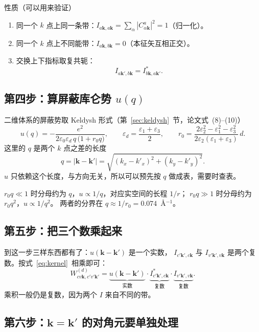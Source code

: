 \documentclass[11pt,a4paper]{ctexart}
\newcommand{\kk}{\mathbf{k}}
\newcommand{\kq}{\mathbf{k}'}
\newcommand{\eps}{\varepsilon}
\begin{document}
性质（可以用来验证）
\begin{enumerate}
  \item 同一个 $k$ 点上同一条带：$I_{a\kk,a\kk}=\sum_\alpha|C^{a}_{\alpha\kk}|^2=1$（归一化）。
  \item 同一个 $k$ 点上不同能带：$I_{a\kk,b\kk}=0$（本征矢互相正交）。
  \item 交换上下指标取复共轭：
        \begin{equation}
        I_{a\kq,b\kk}=I^{*}_{b\kk,a\kq} .
        \label{eq:I_herm}
        \end{equation}
\end{enumerate}

\subsection{第四步：算屏蔽库仑势 \texorpdfstring{$u(q)$}{u(q)}}

二维体系的屏蔽势取 Keldysh 形式（第~\ref{sec:keldysh}~节，论文式~(8)--(10)）
\begin{equation}
u(q)=-\frac{e^2}{2\eps_0\eps_d\,q\,\big(1+r_0q\big)},
\qquad
\eps_d=\frac{\eps_1+\eps_3}{2},
\qquad
r_0=\frac{2\eps_2^2-\eps_1^2-\eps_3^2}{2\eps_2(\eps_1+\eps_3)}\,d .
\label{eq:keldysh2}
\end{equation}
这里的 $q$ 是两个 $k$ 点之差的长度
\begin{equation}
q=|\kk-\kq|=\sqrt{(k_x-k'_x)^2+(k_y-k'_y)^2}.
\label{eq:qmod}
\end{equation}
$u$ 只依赖这个长度，与方向无关，所以可以预先按 $q$ 做成表，需要时查表。

$r_0q\ll1$ 时分母约为 $q$，$u\propto1/q$，对应实空间的长程 $1/r$；
$r_0q\gg1$ 时分母约为 $r_0q^2$，$u\propto1/q^2$。
两者的分界在 $q\approx1/r_0=0.074$~\AA$^{-1}$。

\subsection{第五步：把三个数乘起来}

到这一步三样东西都有了：$u(\kk-\kq)$ 是一个实数，
$I_{c'\kq,c\kk}$ 与 $I_{v'\kq,v\kk}$ 是两个复数。按式~\eqref{eq:kernel}~相乘即可：
\begin{equation*}
W^{(d)}_{cv\kk,c'v'\kq}
=\underbrace{u(\kk-\kq)}_{\text{实数}}\cdot
\underbrace{I^{*}_{c'\kq,c\kk}}_{\text{复数}}\cdot
\underbrace{I_{v'\kq,v\kk}}_{\text{复数}} .
\end{equation*}
乘积一般仍是复数，因为两个 $I$ 来自不同的带。

\subsection{第六步：$\kk=\kq$ 的对角元要单独处理}
\label{sec:reg}
\end{document}
